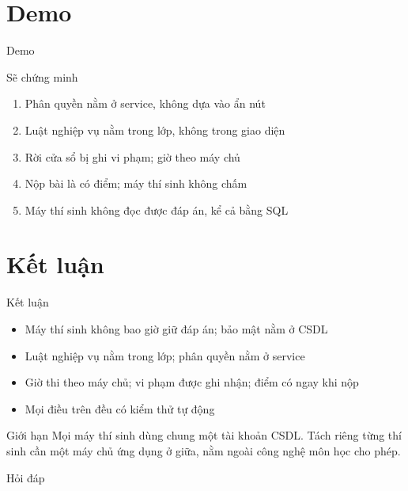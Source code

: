 \documentclass[aspectratio=169,11pt]{beamer}
\begin{document}
\section{Demo}
\begin{frame}{Demo}
  \begin{block}{Sẽ chứng minh}
    \begin{enumerate}
      \item Phân quyền nằm ở service, không dựa vào ẩn nút
      \item Luật nghiệp vụ nằm trong lớp, không trong giao diện
      \item Rời cửa sổ bị ghi vi phạm; giờ theo máy chủ
      \item Nộp bài là có điểm; máy thí sinh không chấm
      \item Máy thí sinh không đọc được đáp án, kể cả bằng SQL
    \end{enumerate}
  \end{block}
\end{frame}

\section{Kết luận}
\begin{frame}{Kết luận}
  \begin{itemize}
    \item Máy thí sinh không bao giờ giữ đáp án; bảo mật nằm ở CSDL
    \item Luật nghiệp vụ nằm trong lớp; phân quyền nằm ở service
    \item Giờ thi theo máy chủ; vi phạm được ghi nhận; điểm có ngay khi nộp
    \item Mọi điều trên đều có kiểm thử tự động
  \end{itemize}
  \begin{alertblock}{Giới hạn}
    Mọi máy thí sinh dùng chung một tài khoản CSDL. Tách riêng từng thí sinh cần một máy chủ ứng dụng ở giữa,
    nằm ngoài công nghệ môn học cho phép.
  \end{alertblock}
  \vfill
  \par\vspace{2pt}
  {\normalsize Hỏi đáp}\par\vspace{4pt}
\end{frame}
\end{document}
